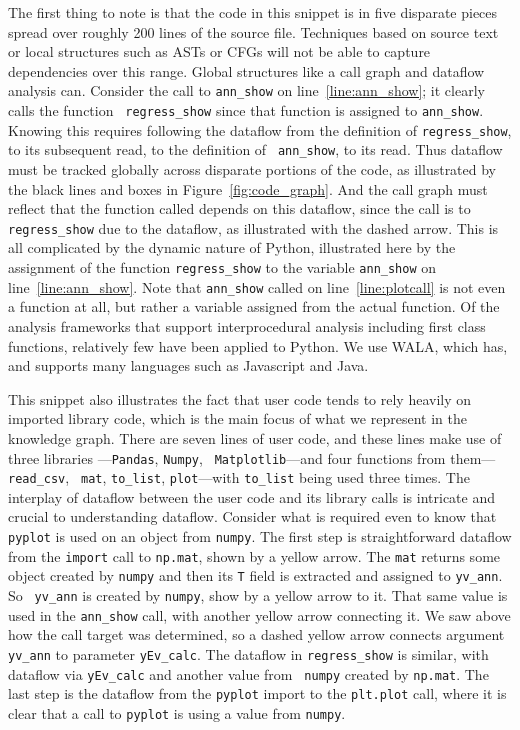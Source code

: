  The first thing to note is that the code in this snippet is in five
disparate pieces spread over roughly 200 lines of the source file.  Techniques
based on source text or local structures such as ASTs or CFGs will not
be able to capture dependencies over this range.  Global structures like a
call graph and dataflow analysis can.  Consider the call to {\tt ann\_show} on
line~\ref{line:ann_show}; it clearly calls the function {\tt
regress\_show} since that function is assigned to {\tt ann\_show}.
Knowing this requires following the dataflow from the definition of
{\tt regress\_show}, to its subsequent read, to the definition of {\tt
ann\_show}, to its read.  Thus dataflow must be tracked globally
across disparate portions of the code, as illustrated by the black
lines and boxes in Figure~\ref{fig:code_graph}.  And the call graph
must reflect that the function called depends on this dataflow, since
the call is to {\tt regress\_show} due to the dataflow, as illustrated
with the dashed arrow.  This is all complicated by the dynamic
nature of Python, illustrated here by the assignment of the function
{\tt regress\_show} to the variable {\tt ann\_show} on
line~\ref{line:ann_show}.  Note that {\tt ann\_show} called on
line~\ref{line:plotcall} is not even a function at all, but rather a variable
assigned from the actual function.  Of the analysis frameworks that
support interprocedural analysis including first class functions,
relatively few have been applied to Python.  We use WALA, which has, and supports many languages such as Javascript and Java.

This snippet also illustrates the fact that user code tends to rely heavily on imported library code, which is the main focus of what we represent in the knowledge graph.  There are seven lines of user code, and these lines
make use of three libraries ---{\tt Pandas}, {\tt Numpy}, {\tt
Matplotlib}---and four functions from them---{\tt read\_csv}, {\tt
mat}, {\tt to\_list}, {\tt plot}---with {\tt to\_list} being used
three times.  The interplay of dataflow between the user code and its
library calls is intricate and crucial to understanding dataflow.
Consider what is required even to know that {\tt pyplot} is used on an
object from {\tt numpy}.  The first step is straightforward dataflow
from the {\tt import} call to {\tt np.mat}, shown by a yellow arrow.
The {\tt mat} returns some object created by {\tt numpy} and then its
{\tt T} field is extracted and assigned to {\tt yv\_ann}.  So {\tt
yv\_ann} is created by {\tt numpy}, show by a yellow arrow to it.
That same value is used in the {\tt ann\_show} call, with another
yellow arrow connecting it.  We saw above how the call target was
determined, so a dashed yellow arrow connects argument {\tt yv\_ann}
to parameter {\tt yEv\_calc}.  The dataflow in {\tt regress\_show} is
similar, with dataflow via {\tt yEv\_calc} and another value from {\tt
numpy} created by {\tt np.mat}.  The last step is the dataflow from
the {\tt pyplot} import to the {\tt plt.plot} call, where it is clear
that a call to {\tt pyplot} is using a value from {\tt numpy}.


